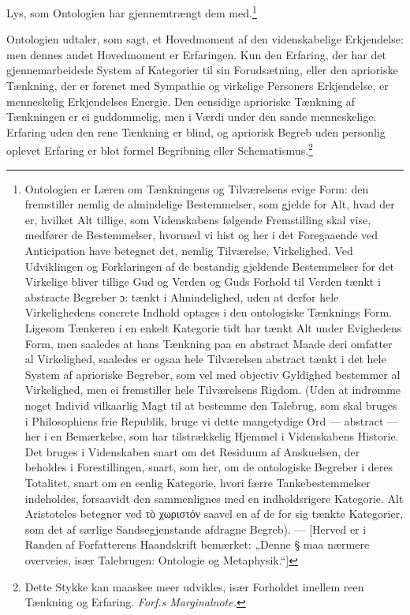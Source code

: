 \documentclass[12pt]{article}
\newcommand{\opage}[1]{\marginnote{\footnotesize\textit{[#1]}}}
\begin{document}
Lys, som Ontologien har gjennemtrængt dem med.\footnote{Ontologien er Læren om
Tænkningens og Tilværelsens evige Form: den fremstiller nemlig de almindelige
Bestemmelser, som gjelde for Alt, hvad der er, hvilket Alt tillige, som
Videnskabens følgende Fremstilling skal vise, medfører de Bestemmelser, hvormed
vi hist og her i det Foregaaende ved Anticipation have betegnet det, nemlig
Tilværelse, Virkelighed. Ved Udviklingen og Forklaringen af de bestandig
gjeldende Bestemmelser for det Virkelige bliver tillige Gud og Verden og Guds
Forhold til Verden tænkt i abstracte Begreber ɔ: tænkt i Almindelighed, uden at
derfor hele Virkelighedens concrete Indhold optages i den ontologiske Tænknings
Form. Ligesom Tænkeren i en enkelt Kategorie tidt har tænkt Alt under Evighedens
Form, men saaledes at hans Tænkning paa en abstract Maade deri omfatter al
Virkelighed, saaledes er ogsaa hele Tilværelsen abstract tænkt i det hele System
af aprioriske Begreber, som vel med objectiv Gyldighed bestemmer al Virkelighed,
men ei fremstiller hele Tilværelsens Rigdom. (Uden at indrømme noget Individ
vilkaarlig Magt til at bestemme den Talebrug, som skal bruges i Philosophiens
frie Republik, bruge vi dette mangetydige Ord --- abstract --- her i en
Bemærkelse, som har tilstrækkelig Hjemmel i Videnskabens Historie. Det bruges i
Videnskaben snart om det Residuum af Anskuelsen, der beholdes i Forestillingen,
snart, som her, om de ontologiske Begreber i deres Totalitet, snart om en eenlig
Kategorie, hvori færre Tankebestemmelser indeholdes, forsaavidt den
sammenlignes med en indholdsrigere Kategorie. Alt Aristoteles betegner ved
τὸ χωριστόν saavel en af de for sig tænkte Kategorier, som det af
særlige Sandsegjenstande afdragne Begreb). --- [Herved er i Randen af
Forfatterens Haandskrift bemærket: „Denne § maa nærmere overveies, især
Talebrugen: Ontologie og Metaphysik.“]}

Ontologien udtaler, som sagt, et Hovedmoment af den \opage{203}videnskabelige
Erkjendelse: men dennes andet Hovedmoment er Erfaringen. Kun den Erfaring, der
har det gjennemarbeidede System af Kategorier til sin Forudsætning, eller den
aprioriske Tænkning, der er forenet med Sympathie og virkelige Personers
Erkjendelse, er menneskelig Erkjendelses Energie. Den eensidige aprioriske
Tænkning af Tænkningen er ei guddommelig, men i Værdi under den sande
menneskelige. Erfaring uden den rene Tænkning er blind, og apriorisk Begreb uden
personlig oplevet Erfaring er blot formel Begribning eller
Schematismus.\footnote{Dette Stykke kan maaskee meer udvikles, især Forholdet
imellem reen Tænkning og Erfaring. \emph{Forf.s Marginalnote.}}
\end{document}

